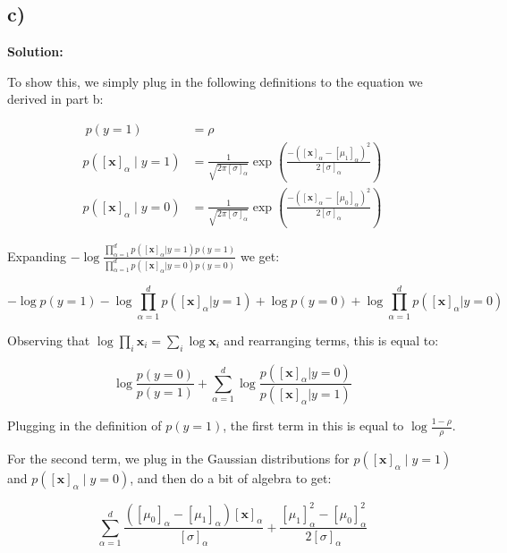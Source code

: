 \documentclass[a4paper]{article}
\begin{document}
\subsection*{c)}


\textbf{Solution:}


To show this, we simply plug in the following definitions to the equation we derived in part b:

\begin{align*}\
p(y=1) &= \rho \\
p([\textbf{x}]_{\alpha} \mid y=1)&=\frac{1}{\sqrt{2\pi[\sigma]_{\alpha}}}\exp\left(\frac{-([\textbf{x}]_{\alpha}-[\mu_{1}]_{\alpha})^{2}}{2[\sigma]_{\alpha}}\right) \\
p([\textbf{x}]_{\alpha} \mid y=0)&=\frac{1}{\sqrt{2\pi[\sigma]_{\alpha}}}\exp\left(\frac{-([\textbf{x}]_{\alpha}-[\mu_{0}]_{\alpha})^{2}}{2[\sigma]_{\alpha}}\right)
\end{align*}

Expanding $-\log\frac{\prod_{\alpha=1}^{d} p([\textbf{x}]_{\alpha}|y=1)p(y=1)}{\prod_{\alpha=1}^{d} p([\textbf{x}]_{\alpha}|y=0)p(y=0)}$ we get:

\begin{equation*}
-\log p(y=1) - \log \prod_{\alpha=1}^{d} p([\textbf{x}]_{\alpha}|y=1) + \log p(y=0) + \log \prod_{\alpha=1}^{d} p([\textbf{x}]_{\alpha}|y=0)
\end{equation*}

Observing that $\log \prod_{i} \textbf{x}_{i} = \sum_{i} \log \textbf{x}_{i}$ and rearranging terms, this is equal to:

\begin{equation*}
\log \frac{p(y=0)}{p(y=1)} + \sum_{\alpha=1}^{d} \log \frac{p([\textbf{x}]_{\alpha}|y=0)}{p([\textbf{x}]_{\alpha}|y=1)}
\end{equation*}

Plugging in the definition of $p(y=1)$, the first term in this is equal to $\log \frac{1-\rho}{\rho}$. 

For the second term, we plug in the Gaussian distributions for $p([\textbf{x}]_{\alpha} \mid y=1)$ and $p([\textbf{x}]_{\alpha} \mid y=0)$, and then do a bit of algebra to get:

\begin{equation*}
\sum_{\alpha=1}^{d} \frac{([\mu_{0}]_{\alpha}-[\mu_{1}]_{\alpha})[\textbf{x}]_{\alpha}}{[\sigma]_{\alpha}} + \frac{[\mu_{1}]^{2}_{\alpha}-[\mu_{0}]^{2}_{\alpha}}{2[\sigma]_{\alpha}}
\end{equation*}
\end{document}
